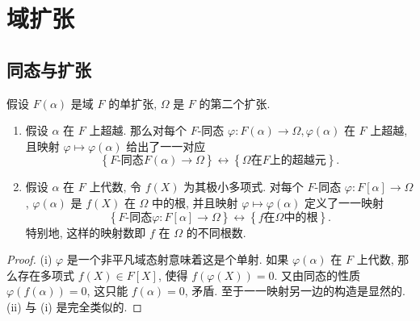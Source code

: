 \chapter{域扩张}

\section{同态与扩张}

\begin{proposition}
  假设 \( F(\alpha) \) 是域 \( F \) 的单扩张, \( \Omega \) 是 \( F \)
  的第二个扩张.
  \begin{enumerate}
    \item 假设 \( \alpha \) 在 \( F \) 上超越. 那么对每个 \( F \)-同态 \(
      \varphi: F(\alpha) \to \Omega, \varphi(\alpha) \) 在 \( F \) 上超越,
      且映射 \( \varphi \mapsto \varphi(\alpha) \) 给出了一一对应
      \[
        \left\lbrace F\text{-同态} F(\alpha) \to \Omega \right\rbrace
        \leftrightarrow \left\lbrace \Omega \text{在} F \text{上的超越元}
        \right\rbrace.
      \]
    \item 假设 \( \alpha \) 在 \( F \) 上代数, 令 \( f(X) \) 为其极小多项式.
      对每个 \( F \)-同态 \( \varphi: F[\alpha] \to \Omega \), \(
      \varphi(\alpha) \) 是 \( f(X) \) 在 \( \Omega \) 中的根, 并且映射 \(
      \varphi \mapsto \varphi(\alpha) \) 定义了一一映射
      \[
        \left\lbrace F \text{-同态} \varphi: F[\alpha] \to \Omega \right\rbrace
        \leftrightarrow \left\lbrace f \text{在} \Omega \text{中的根}
        \right\rbrace.
      \]
      特别地, 这样的映射数即 \( f \) 在 \( \Omega \) 的不同根数.
  \end{enumerate}
\end{proposition}
\begin{proof}
  (i) \( \varphi \) 是一个非平凡域态射意味着这是个单射. 如果 \( \varphi(\alpha)
  \) 在 \( F \) 上代数, 那么存在多项式 \( f(X) \in F[X] \), 使得 \(
  f(\varphi(X)) = 0 \). 又由同态的性质 \( \varphi(f(\alpha)) = 0 \), 这只能 \(
  f(\alpha) = 0 \), 矛盾. 至于一一映射另一边的构造是显然的.
  (ii) 与 (i) 是完全类似的.
\end{proof}

